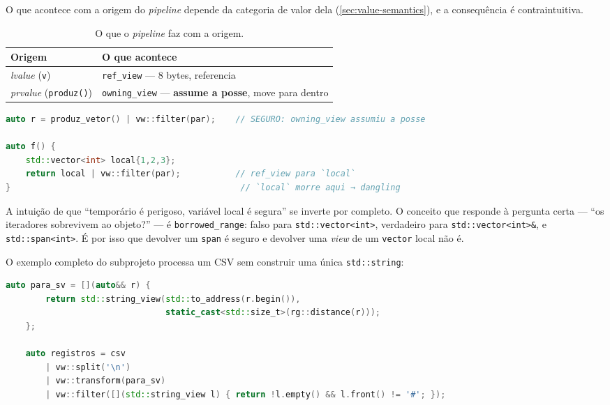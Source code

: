 O que acontece com a origem do \emph{pipeline} depende da categoria de valor
dela (\cref{sec:value-semantics}), e a consequência é contraintuitiva.

\begin{table}[htbp]
\centering
\caption{O que o \emph{pipeline} faz com a origem.}
\label{tab:origem-view}
\footnotesize
\begin{tabular}{@{}ll@{}}
\toprule
\textbf{Origem} & \textbf{O que acontece} \\
\midrule
\emph{lvalue} (\texttt{v})          & \texttt{ref\_view} --- 8 bytes, referencia \\
\emph{prvalue} (\texttt{produz()})  & \texttt{owning\_view} --- \textbf{assume a posse}, move para dentro \\
\bottomrule
\end{tabular}
\end{table}

\begin{armadilha}
\begin{lstlisting}[style=bt, language=C++, frame=none,
                   xleftmargin=0pt, xrightmargin=0pt]
auto r = produz_vetor() | vw::filter(par);    // SEGURO: owning_view assumiu a posse

auto f() {
    std::vector<int> local{1,2,3};
    return local | vw::filter(par);           // ref_view para `local`
}                                              // `local` morre aqui → dangling
\end{lstlisting}
A intuição de que ``temporário é perigoso, variável local é segura'' se inverte
por completo. O conceito que responde à pergunta certa --- ``os iteradores
sobrevivem ao objeto?'' --- é \texttt{borrowed\_range}: falso para
\texttt{std::vector<int>}, verdadeiro para \texttt{std::vector<int>\&},
 e \texttt{std::span<int>}. É por isso que devolver
um \texttt{span} é seguro e devolver uma \emph{view} de um \texttt{vector} local
não é.
\end{armadilha}

O exemplo completo do subprojeto processa um CSV sem construir uma única
\texttt{std::string}:

\begin{lstlisting}[style=bt, language=C++,
    caption={O \emph{pipeline} de \texttt{src/ranges/demo\_pipelines.hpp}.}]
    auto para_sv = [](auto&& r) {
        return std::string_view(std::to_address(r.begin()),
                                static_cast<std::size_t>(rg::distance(r)));
    };

    auto registros = csv
        | vw::split('\n')
        | vw::transform(para_sv)
        | vw::filter([](std::string_view l) { return !l.empty() && l.front() != '#'; });
\end{lstlisting}

